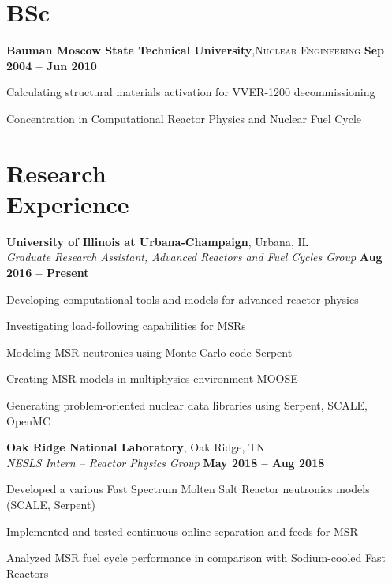 \documentclass[margin,line]{resume}
\begin{document}
\begin{resume}
    \section{\mysidestyle BSc}
    \textbf{Bauman Moscow State Technical University},\textsc{Nuclear Engineering}\hfill \textbf{ Sep 2004 -- Jun 2010}\vspace{-3mm}\\\vspace{-1mm}%
    \begin{list2}
	\item Calculating structural materials activation for VVER-1200 decommissioning
	\item Concentration in Computational Reactor Physics and Nuclear Fuel Cycle
    \end{list2}\vspace{-1.5mm}
    \section{\mysidestyle Research\\Experience}               
    \textbf{University of Illinois at Urbana-Champaign}, Urbana, IL\\
		\textsl{Graduate Research Assistant, Advanced Reactors and Fuel Cycles Group} \hfill \textbf{Aug 2016 -- Present}\\
                \vspace{-4mm}\begin{list2}
                \item Developing computational tools and models for advanced 
                reactor physics
                \item Investigating load-following capabilities for MSRs
                \item Modeling MSR neutronics using Monte Carlo code 
                Serpent
				\item Creating MSR models in multiphysics environment MOOSE
				\item Generating problem-oriented nuclear data libraries using 
				Serpent, SCALE, OpenMC
                \end{list2}

    \textbf{Oak Ridge National Laboratory}, Oak Ridge, TN\\
		\textsl{NESLS Intern -- Reactor Physics Group} \hfill \textbf{May 2018 
		-- Aug 2018}\\
                \vspace{-4mm}\begin{list2}
                \item Developed a various Fast Spectrum Molten Salt Reactor 
                neutronics models (SCALE, Serpent)
				\item Implemented and tested continuous online separation and 
				feeds for MSR
				\item Analyzed MSR fuel cycle performance in comparison with 
				Sodium-cooled Fast Reactors
                \end{list2}


\end{resume}
\end{document}
